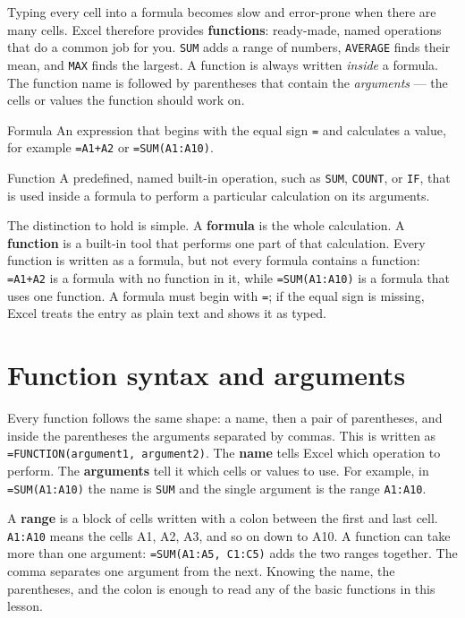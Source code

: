 Typing every cell into a formula becomes slow and error-prone when there are
many cells. Excel therefore provides \textbf{functions}: ready-made, named
operations that do a common job for you. \texttt{SUM} adds a range of
numbers, \texttt{AVERAGE} finds their mean, and \texttt{MAX} finds the largest.
A function is always written \emph{inside} a formula. The function name is
followed by parentheses that contain the \emph{arguments} --- the cells or
values the function should work on.

\begin{definitionbox}{Formula}
An expression that begins with the equal sign \texttt{=} and calculates a
value, for example \texttt{=A1+A2} or \texttt{=SUM(A1:A10)}.
\end{definitionbox}

\begin{definitionbox}{Function}
A predefined, named built-in operation, such as \texttt{SUM}, \texttt{COUNT},
or \texttt{IF}, that is used inside a formula to perform a particular
calculation on its arguments.
\end{definitionbox}

The distinction to hold is simple. A \textbf{formula} is the whole
calculation. A \textbf{function} is a built-in tool that performs one part of
that calculation. Every function is written as a formula, but not every
formula contains a function: \texttt{=A1+A2} is a formula with no function in
it, while \texttt{=SUM(A1:A10)} is a formula that uses one function. A
formula must begin with \texttt{=}; if the equal sign is missing, Excel treats
the entry as plain text and shows it as typed.

\section{Function syntax and arguments}
Every function follows the same shape: a name, then a pair of parentheses, and
inside the parentheses the arguments separated by commas. This is written as
\texttt{=FUNCTION(argument1, argument2)}. The \textbf{name} tells Excel which
operation to perform. The \textbf{arguments} tell it which cells or values to
use. For example, in \texttt{=SUM(A1:A10)} the name is \texttt{SUM} and the
single argument is the range \texttt{A1:A10}.

A \textbf{range} is a block of cells written with a colon between the first
and last cell. \texttt{A1:A10} means the cells A1, A2, A3, and so on down to
A10. A function can take more than one argument: \texttt{=SUM(A1:A5, C1:C5)}
adds the two ranges together. The comma separates one argument from the next.
Knowing the name, the parentheses, and the colon is enough to read any of the
basic functions in this lesson.


